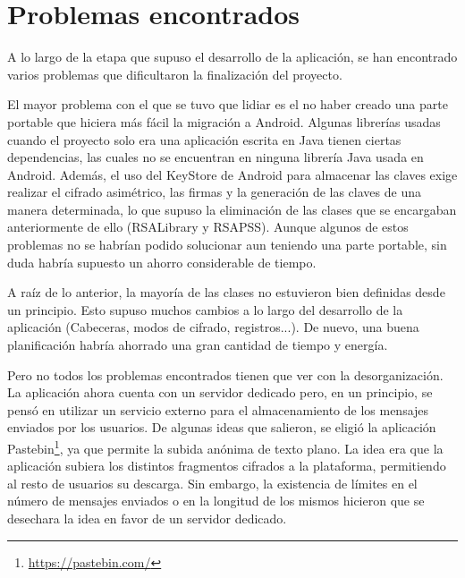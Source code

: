 
\section{Problemas encontrados}

A lo largo de la etapa que supuso el desarrollo de la aplicación, se han encontrado varios problemas que dificultaron la finalización del proyecto.

El mayor problema con el que se tuvo que lidiar es el no haber creado una parte portable que hiciera más fácil la migración a Android. Algunas librerías usadas cuando el proyecto solo era una aplicación escrita en Java tienen ciertas dependencias, las cuales no se encuentran en ninguna librería Java usada en Android. Además, el uso del KeyStore de Android para almacenar las claves exige realizar el cifrado asimétrico, las firmas y la generación de las claves de una manera determinada, lo que supuso la eliminación de las clases que se encargaban anteriormente de ello (RSALibrary y RSAPSS). Aunque algunos de estos problemas no se habrían podido solucionar aun teniendo una parte portable, sin duda habría supuesto un ahorro considerable de tiempo.

A raíz de lo anterior, la mayoría de las clases no estuvieron bien definidas desde un principio. Esto supuso muchos cambios a lo largo del desarrollo de la aplicación (Cabeceras, modos de cifrado, registros...). De nuevo, una buena planificación habría ahorrado una gran cantidad de tiempo y energía.

Pero no todos los problemas encontrados tienen que ver con la desorganización. La aplicación ahora cuenta con un servidor dedicado pero, en un principio, se pensó en utilizar un servicio externo para el almacenamiento de los mensajes enviados por los usuarios. De algunas ideas que salieron, se eligió la aplicación Pastebin\footnote{\url{https://pastebin.com/}}, ya que permite la subida anónima de texto plano. La idea era que la aplicación subiera los distintos fragmentos cifrados a la plataforma, permitiendo al resto de usuarios su descarga. Sin embargo, la existencia de límites en el número de mensajes enviados o en la longitud de los mismos hicieron que se desechara la idea en favor de un servidor dedicado.
